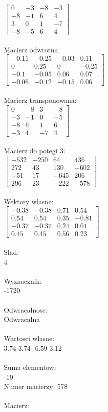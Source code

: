 \documentclass[a4paper,12pt]{article}
\begin{document}
$\begin{bmatrix} 0&-3&-8&-3\\-8&-1&6&4\\3&0&1&-7\\-8&-5&6&4 \end{bmatrix}$
\\
\\
Macierz odwrotna:\\

$\begin{bmatrix} -0.11&-0.25&-0.03&0.11\\0&0.25&0&-0.25\\-0.1&-0.05&0.06&0.07\\-0.06&-0.12&-0.15&0.06 \end{bmatrix}$
\\
\\
Macierz transponowana:\\

$\begin{bmatrix} 0&-8&3&-8\\-3&-1&0&-5\\-8&6&1&6\\-3&4&-7&4 \end{bmatrix}$
\\
\\
Macierz do potegi 3:\\

$\begin{bmatrix} -532&-250&64&436\\272&43&130&-602\\-51&17&-645&206\\296&23&-222&-578 \end{bmatrix}$
\\
\\
Wektory wlasne:\\

$\begin{bmatrix} -0.38&-0.38&0.71&0.54\\0.54&0.54&0.35&-0.81\\-0.37&-0.37&0.24&0.01\\0.45&0.45&0.56&0.23 \end{bmatrix}$
\\
\\
Slad:\\
4
\\
\\
Wyznacznik:\\
-1720
\\
\\
Odwracalnosc:\\
Odwracalna
\\
\\
Wartosci wlasne:\\
3.74 3.74 -6.59 3.12
\\
\\
Suma elementow:\\
-19
\\
\newpage
Numer macierzy:
578
\\
\\
Macierz:\\
\end{document}
